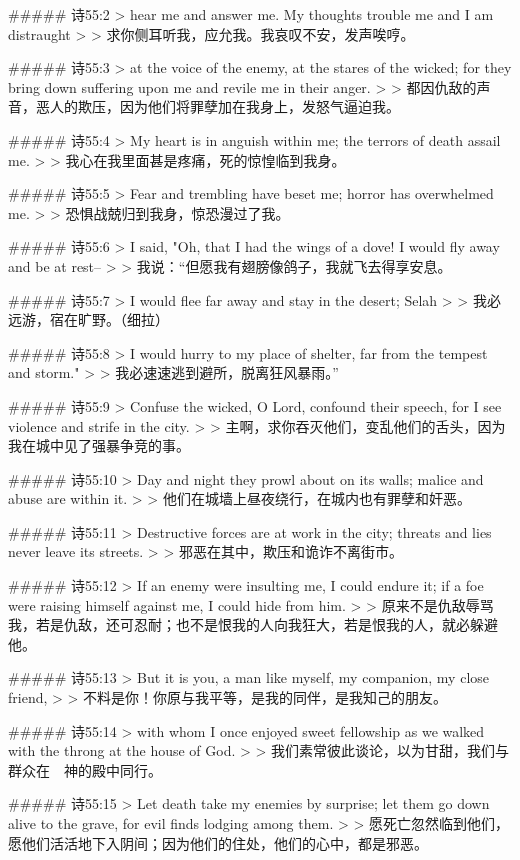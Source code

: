 ##### 诗55:2
> hear me and answer me. My thoughts trouble me and I am distraught
>
> 求你侧耳听我，应允我。我哀叹不安，发声唉哼。


##### 诗55:3
> at the voice of the enemy, at the stares of the wicked; for they bring down suffering upon me and revile me in their anger.
>
> 都因仇敌的声音，恶人的欺压，因为他们将罪孽加在我身上，发怒气逼迫我。


##### 诗55:4
> My heart is in anguish within me; the terrors of death assail me.
>
> 我心在我里面甚是疼痛，死的惊惶临到我身。


##### 诗55:5
> Fear and trembling have beset me; horror has overwhelmed me.
>
> 恐惧战兢归到我身，惊恐漫过了我。


##### 诗55:6
> I said, "Oh, that I had the wings of a dove! I would fly away and be at rest--
>
> 我说：“但愿我有翅膀像鸽子，我就飞去得享安息。


##### 诗55:7
> I would flee far away and stay in the desert; Selah
>
> 我必远游，宿在旷野。（细拉）


##### 诗55:8
> I would hurry to my place of shelter, far from the tempest and storm."
>
> 我必速速逃到避所，脱离狂风暴雨。”


##### 诗55:9
> Confuse the wicked, O Lord, confound their speech, for I see violence and strife in the city.
>
> 主啊，求你吞灭他们，变乱他们的舌头，因为我在城中见了强暴争竞的事。


##### 诗55:10
> Day and night they prowl about on its walls; malice and abuse are within it.
>
> 他们在城墙上昼夜绕行，在城内也有罪孽和奸恶。


##### 诗55:11
> Destructive forces are at work in the city; threats and lies never leave its streets.
>
> 邪恶在其中，欺压和诡诈不离街市。


##### 诗55:12
> If an enemy were insulting me, I could endure it; if a foe were raising himself against me, I could hide from him.
>
> 原来不是仇敌辱骂我，若是仇敌，还可忍耐；也不是恨我的人向我狂大，若是恨我的人，就必躲避他。


##### 诗55:13
> But it is you, a man like myself, my companion, my close friend,
>
> 不料是你！你原与我平等，是我的同伴，是我知己的朋友。


##### 诗55:14
> with whom I once enjoyed sweet fellowship as we walked with the throng at the house of God.
>
> 我们素常彼此谈论，以为甘甜，我们与群众在　神的殿中同行。


##### 诗55:15
> Let death take my enemies by surprise; let them go down alive to the grave, for evil finds lodging among them.
>
> 愿死亡忽然临到他们，愿他们活活地下入阴间；因为他们的住处，他们的心中，都是邪恶。


